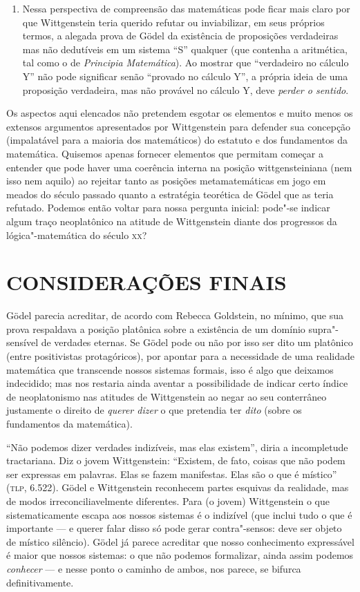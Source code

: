 {\begin{enumerate}
\item Nessa perspectiva de compreensão das matemáticas pode ficar
mais claro por que Wittgenstein teria querido refutar ou
inviabilizar, em seus próprios termos, a alegada prova de Gödel
da existência de proposições verdadeiras mas não dedutíveis em
um sistema ``S'' qualquer (que
contenha a aritmética, tal como o de \emph{Principia
Matemática}). Ao mostrar que “verdadeiro no cálculo Y” não pode
significar senão “provado no cálculo Y”, a própria ideia de uma
proposição verdadeira, mas não provável no cálculo Y, deve
\emph{perder o sentido}.
\end{enumerate}

Os aspectos aqui elencados não pretendem esgotar os elementos
e muito menos os extensos argumentos apresentados por
Wittgenstein para defender sua concepção (impalatável para a
maioria dos matemáticos) do estatuto e dos fundamentos da
matemática. Quisemos apenas fornecer elementos que permitam
começar a entender que pode haver uma coerência interna na
posição wittgensteiniana (nem isso nem aquilo) ao rejeitar tanto
as posições metamatemáticas em jogo em meados do século passado
quanto a estratégia teorética de Gödel que as teria refutado.
Podemos então voltar para nossa pergunta inicial: pode"-se
indicar algum traço neoplatônico na atitude de Wittgenstein
diante dos progressos da lógica"-matemática do século \textsc{xx}?

\section{CONSIDERAÇÕES FINAIS}

Gödel parecia acreditar, de acordo com Rebecca Goldstein, no
mínimo, que sua prova respaldava a posição platônica sobre a
existência de um domínio supra"-sensível de verdades eternas. Se
Gödel pode ou não por isso ser dito um platônico (entre
positivistas protagóricos), por apontar para a necessidade de
uma realidade matemática que transcende nossos sistemas formais,
isso é algo que deixamos indecidido; mas nos restaria ainda
aventar a possibilidade de indicar certo índice de neoplatonismo
nas atitudes de Wittgenstein ao negar ao seu conterrâneo
justamente o direito de \emph{querer dizer} o que pretendia
ter \emph{dito} (sobre os fundamentos da matemática).

“Não podemos dizer verdades indizíveis, mas elas existem”,
diria a incompletude tractariana. Diz o jovem Wittgenstein:
“Existem, de fato, coisas que não podem ser expressas em
palavras. Elas se fazem manifestas. Elas são o que é místico”
(\textsc{tlp}, 6.522). Gödel e Wittgenstein reconhecem partes esquivas da
realidade, mas de modos irreconciliavelmente diferentes. Para (o
jovem) Wittgenstein o que sistematicamente escapa aos nossos
sistemas é o indizível (que inclui tudo o que é importante --- e
querer falar disso só pode gerar contra"-sensos: deve ser objeto
de místico silêncio). Gödel já parece acreditar que nosso
conhecimento expressável é maior que nossos sistemas: o que não
podemos formalizar, ainda assim podemos \emph{conhecer} --- e
nesse ponto o caminho de ambos, nos parece, se bifurca
definitivamente.

}
